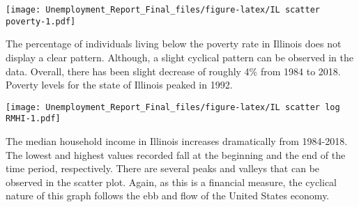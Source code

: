 \documentclass[
]{article}
\newenvironment{Shaded}{\begin{snugshade}}{\end{snugshade}}
\newcommand{\CharTok}[1]{\textcolor[rgb]{0.31,0.60,0.02}{#1}}
\newcommand{\CommentTok}[1]{\textcolor[rgb]{0.56,0.35,0.01}{\textit{#1}}}
\newcommand{\DataTypeTok}[1]{\textcolor[rgb]{0.13,0.29,0.53}{#1}}
\newcommand{\DecValTok}[1]{\textcolor[rgb]{0.00,0.00,0.81}{#1}}
\newcommand{\KeywordTok}[1]{\textcolor[rgb]{0.13,0.29,0.53}{\textbf{#1}}}
\newcommand{\NormalTok}[1]{#1}
\newcommand{\OperatorTok}[1]{\textcolor[rgb]{0.81,0.36,0.00}{\textbf{#1}}}
\newcommand{\StringTok}[1]{\textcolor[rgb]{0.31,0.60,0.02}{#1}}
\begin{document}
\texttt{[image: Unemployment\_Report\_Final\_files/figure-latex/IL scatter poverty-1.pdf]}

The percentage of individuals living below the poverty rate in Illinois
does not display a clear pattern. Although, a slight cyclical pattern
can be observed in the data. Overall, there has been slight decrease of
roughly 4\% from 1984 to 2018. Poverty levels for the state of Illinois
peaked in 1992.

\begin{Shaded}
\end{Shaded}

\texttt{[image: Unemployment\_Report\_Final\_files/figure-latex/IL scatter log RMHI-1.pdf]}

The median household income in Illinois increases dramatically from
1984-2018. The lowest and highest values recorded fall at the beginning
and the end of the time period, respectively. There are several peaks
and valleys that can be observed in the scatter plot. Again, as this is
a financial measure, the cyclical nature of this graph follows the ebb
and flow of the United States economy.

\begin{Shaded}
\end{Shaded}
\end{document}
